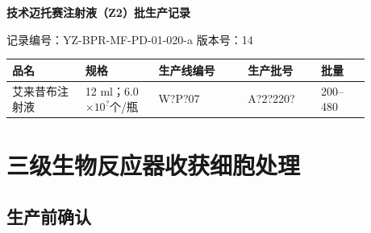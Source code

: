 \documentclass[UTF8,10pt,a4paper,fontset=fandol]{ctexart}
\newcommand{\fieldvalue}[1]{#1}
\newcommand{\handwritten}[1]{#1}
\begin{document}
\newpage

\begin{center}
\textbf{技术迈托赛注射液（Z2）批生产记录}
\end{center}

\noindent
记录编号：YZ-BPR-MF-PD-01-020-a \hfill 版本号：14

\begin{tabular}{|p{0.18\linewidth}|p{0.18\linewidth}|p{0.22\linewidth}|p{0.18\linewidth}|p{0.12\linewidth}|}
\hline
品名 & 规格 & 生产线编号 & 生产批号 & 批量\\
\hline
艾来昔布注射液 & 12 ml；6.0$\times 10^?$个/瓶 &
\fieldvalue{\handwritten{W?P?07}} &
\fieldvalue{\handwritten{A?2?220?}} &
200--480\\
\hline
\end{tabular}

\section{三级生物反应器收获细胞处理}

\subsection{生产前确认}
\end{document}
